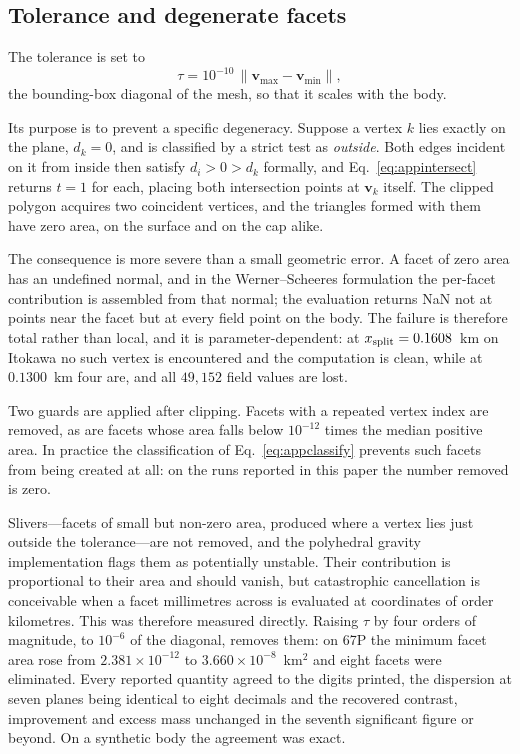\subsection{Tolerance and degenerate facets}
\label{app:clip:tol}

The tolerance is set to
\begin{equation}
\tau = 10^{-10} \, \lVert \mathbf{v}_{\max} - \mathbf{v}_{\min} \rVert ,
\label{eq:apptol}
\end{equation}
the bounding-box diagonal of the mesh, so that it scales with the body.

Its purpose is to prevent a specific degeneracy. Suppose a vertex $k$ lies
exactly on the plane, $d_k = 0$, and is classified by a strict test as
\emph{outside}. Both edges incident on it from inside then satisfy
$d_i > 0 > d_k$ formally, and Eq.~\eqref{eq:appintersect} returns $t = 1$ for
each, placing both intersection points at $\mathbf{v}_k$ itself. The clipped
polygon acquires two coincident vertices, and the triangles formed with them
have zero area, on the surface and on the cap alike.

The consequence is more severe than a small geometric error. A facet of zero
area has an undefined normal, and in the Werner--Scheeres formulation the
per-facet contribution is assembled from that normal; the evaluation returns
NaN not at points near the facet but at every field point on the body. The
failure is therefore total rather than local, and it is parameter-dependent: at
$x_{\mathrm{split}} = 0.1608$~km on Itokawa no such vertex is encountered and the
computation is clean, while at $0.1300$~km four are, and all $49{,}152$ field
values are lost.

Two guards are applied after clipping. Facets with a repeated vertex index are
removed, as are facets whose area falls below $10^{-12}$ times the median
positive area. In practice the classification of Eq.~\eqref{eq:appclassify}
prevents such facets from being created at all: on the runs reported in this
paper the number removed is zero.

Slivers---facets of small but non-zero area, produced where a vertex lies just
outside the tolerance---are not removed, and the polyhedral gravity
implementation flags them as potentially unstable. Their contribution is
proportional to their area and should vanish, but catastrophic cancellation is
conceivable when a facet millimetres across is evaluated at coordinates of
order kilometres. This was therefore measured directly. Raising $\tau$ by four
orders of
magnitude, to $10^{-6}$ of the diagonal, removes them: on 67P the minimum facet
area rose from $2.381\times10^{-12}$ to $3.660\times10^{-8}$~km$^2$ and eight
facets were eliminated. Every reported quantity agreed to the digits printed,
the dispersion at seven planes being identical to eight decimals and the
recovered contrast, improvement and excess mass unchanged in the seventh
significant figure or beyond. On a synthetic body the agreement was exact.

